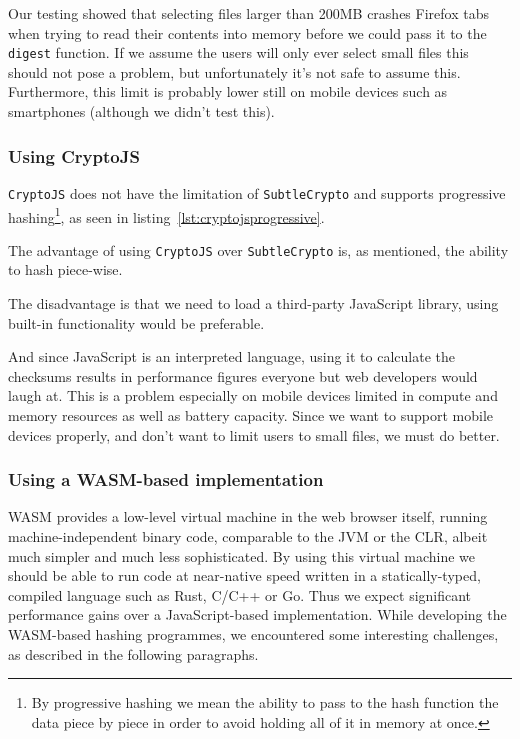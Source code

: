 

Our testing showed that selecting files larger than 200MB crashes Firefox tabs when trying to read their contents
into memory before we could pass it to the \texttt{digest} function.
If we assume the users will only ever select small files this should not pose a problem, but unfortunately it's not safe to assume this.
Furthermore, this limit is probably lower still on mobile devices such as smartphones (although we didn't test this).

\subsubsection{Using CryptoJS}
\label{subsec:cryptojs}
\texttt{CryptoJS} does not have the limitation of \texttt{SubtleCrypto} and supports progressive hashing\footnote{
By progressive hashing we mean the ability to pass to the hash function the data piece by piece in order to avoid holding all of it in memory at once.},
as seen in listing~\ref{lst:cryptojsprogressive}.



The advantage of using \texttt{CryptoJS} over \texttt{SubtleCrypto} is, as mentioned, the ability to hash piece-wise.

The disadvantage is that we need to load a third-party JavaScript library, using built-in functionality would be preferable.

And since JavaScript is an interpreted language, using it to calculate the checksums results in performance figures everyone but web developers would laugh at.
This is a problem especially on mobile devices limited in compute and memory resources as well as battery capacity.
Since we want to support mobile devices properly, and don't want to limit users to small files, we must do better.

\subsubsection{Using a WASM-based implementation}
\label{subsec:wasmhashing}
\gls{WASM} provides a low-level virtual machine in the web browser itself,
running machine-independent binary code, comparable to the \gls{JVM} or the \gls{CLR},
albeit much simpler and much less sophisticated.
By using this virtual machine we should be able to run code at near-native speed written in a statically-typed, compiled language such as Rust, C/C++ or Go.
Thus we expect significant performance gains over a JavaScript-based implementation.
While developing the \gls{WASM}-based hashing programmes, we encountered some interesting challenges, as described in the following paragraphs.

